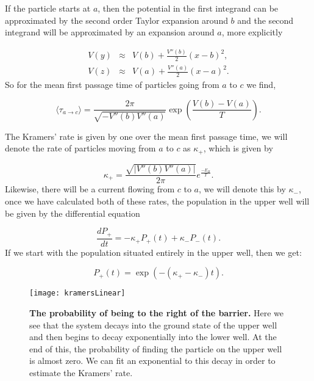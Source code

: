 If the particle starts at $a$, then the potential in the first integrand can be approximated by the second order Taylor expansion around $b$ and the second integrand will be approximated by an expansion around $a$, more explicitly

\begin{eqnarray}
V(y) &\approx& V(b) + \frac{V''(b)}{2}(x - b)^2, \\
V(z) &\approx& V(a) + \frac{V''(a)}{2}(x - a)^2.
\end{eqnarray}
So for the mean first passage time of particles going from $a$ to $c$ we find,

\begin{equation}
\langle \tau_{a \to c} \rangle = \frac{2 \pi}{\sqrt{-V''(b) V''(a)}} \exp{\left (\frac{V(b) - V(a)}{T} \right)}.  \label{eqn:kramersRate}
\end{equation}


The Kramers' rate is given by one over the mean first passage time, we will denote the rate of particles moving from $a$ to $c$ as $\kappa_+$, which is given by

\begin{equation}
\kappa_+ = \frac{\sqrt{|V''(b) V''(a) |}}{2 \pi} e^\frac{-E_B}{T}.
\end{equation}
Likewise, there will be a current flowing from $c$ to $a$, we will denote this by $\kappa_-$, once we have calculated both of these rates, the population in the upper well will be given by the differential equation

\begin{equation}
\frac{d P_+}{dt} = -\kappa_+ P_+(t) + \kappa_- P_-(t).
\end{equation}
If we start with the population situated entirely in the upper well, then we get:

\begin{equation}
P_+(t) = \exp{(-(\kappa_+ - \kappa_- )t)}.
\end{equation}

\begin{figure}
	\center
	\texttt{[image: kramersLinear]}
	\caption{\textbf{The probability of being to the right of the barrier.} Here we see that the system decays into the ground state of the upper well and then begins to decay exponentially into the lower well. At the end of this, the probability of finding the particle on the upper well is almost zero. We can fit an exponential to this decay in order to estimate the Kramers' rate. \label{fig:kramersLinear}}
\end{figure}

